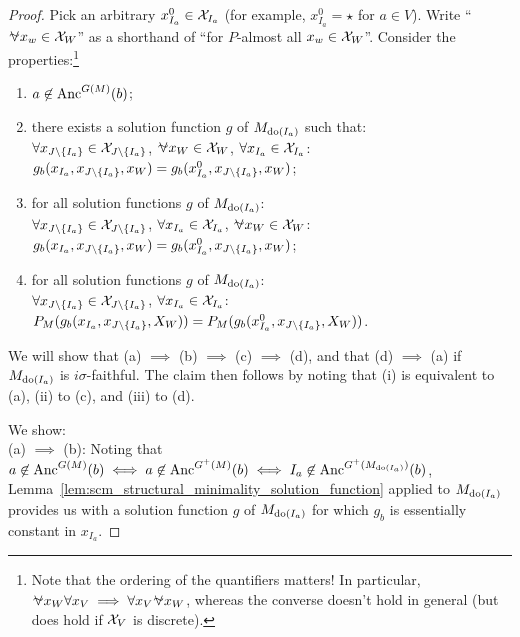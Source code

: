 \begin{proof}
  Pick an arbitrary $x_{I_a}^0 \in \mathcal{X}_{I_a}$ (for example, $x_{I_a}^0 = \star$ for $a \in V$).
  Write ``$\foralmostall x_w \in \CX_W$'' as a shorthand of ``for $P$-almost all $x_w \in \mathcal{X}_W$''.
  Consider the properties:\footnote{Note that the ordering of the quantifiers matters! In particular, $\foralmostall x_W \forall x_V \implies \forall x_V \foralmostall x_W$, whereas the converse doesn't hold in general (but does hold if $\mathcal{X}_V$ is discrete).}
  \begin{enumerate}[label=(\roman*)]
    \item   $a \not\in \mathrm{Anc}^{G(M)}(b)$;
    \item  there exists a solution function $g$ of $M_{\operatorname{do}(I_a)}$ such that:\\
      $\forall x_{J\setminus\{I_a\}} \in \mathcal{X}_{J\setminus\{I_a\}}$, $\foralmostall x_W \in \CX_W$, $\forall x_{I_a} \in \mathcal{X}_{I_a}$: $g_b(x_{I_a},x_{J\setminus\{I_a\}},x_W) = g_b(x_{I_a}^0,x_{J\setminus\{I_a\}},x_W)$;
    \item  for all solution functions $g$ of $M_{\operatorname{do}(I_a)}$:\\
      $\forall x_{J\setminus\{I_a\}} \in \mathcal{X}_{J\setminus\{I_a\}}$, $\forall x_{I_a} \in \mathcal{X}_{I_a}$, $\foralmostall x_W \in \CX_W$: $g_b(x_{I_a},x_{J\setminus\{I_a\}},x_W) = g_b(x_{I_a}^0,x_{J\setminus\{I_a\}},x_W)$;
    \item  for all solution functions $g$ of $M_{\operatorname{do}(I_a)}$:\\
      $\forall x_{J\setminus\{I_a\}} \in \mathcal{X}_{J\setminus\{I_a\}}$, $\forall x_{I_a} \in \mathcal{X}_{I_a}$: $P_M(g_b(x_{I_a},x_{J\setminus\{I_a\}},X_W)) = P_M(g_b(x_{I_a}^0,x_{J\setminus\{I_a\}},X_W))$.
  \end{enumerate}
  We will show that (a) $\implies$ (b) $\implies$ (c) $\implies$ (d), and that (d) $\implies$ (a) if $M_{\operatorname{do}(I_a)}$ is $i\sigma$-faithful.
  The claim then follows by noting that (i) is equivalent to (a), (ii) to (c), and (iii) to (d).

  We show:\\
  (a) $\implies$ (b):
  Noting that
  $a \not\in \mathrm{Anc}^{G(M)}(b) \iff a \not\in \mathrm{Anc}^{G^+(M)}(b) \iff I_a \not\in \mathrm{Anc}^{G^+(M_{\operatorname{do}(I_a)})}(b)$,
  Lemma~\ref{lem:scm_structural_minimality_solution_function} applied to $M_{\operatorname{do}(I_a)}$ provides us with a solution function $g$ of $M_{\operatorname{do}(I_a)}$ for which $g_b$ is essentially constant in $x_{I_a}$.


\end{proof}
